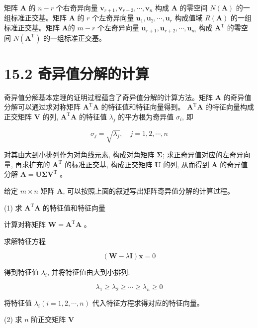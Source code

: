 \documentclass[10pt]{article}
\begin{document}
矩阵 $\boldsymbol{A}$ 的 $n-r$ 个右奇异向量 $\boldsymbol{v}_{r+1}, \boldsymbol{v}_{r+2}, \cdots, \boldsymbol{v}_{n}$ 构成 $\boldsymbol{A}$ 的零空间 $N(\boldsymbol{A})$ 的一组标准正交基。矩阵 $\boldsymbol{A}$ 的 $r$ 个左奇异向量 $\boldsymbol{u}_{1}, \boldsymbol{u}_{2}, \cdots, \boldsymbol{u}_{r}$ 构成值域 $R(\boldsymbol{A})$ 的一组标准正交基。矩阵 $\boldsymbol{A}$的 $m-r$ 个左奇异向量 $\boldsymbol{u}_{r+1}, \boldsymbol{u}_{r+2}, \cdots, \boldsymbol{u}_{m}$ 构成 $\boldsymbol{A}^{\mathrm{T}}$ 的零空间 $N\left(\boldsymbol{A}^{\mathrm{T}}\right)$ 的一组标准正交基。

\section*{15.2 奇异值分解的计算}
奇异值分解基本定理的证明过程蕴含了奇异值分解的计算方法。矩阵 $\boldsymbol{A}$ 的奇异值分解可以通过求对称矩阵 $\boldsymbol{A}^{\mathrm{T}} \boldsymbol{A}$ 的特征值和特征向量得到。 $\boldsymbol{A}^{\mathrm{T}} \boldsymbol{A}$ 的特征向量构成正交矩阵 $\boldsymbol{V}$ 的列, $\boldsymbol{A}^{\mathrm{T}} \boldsymbol{A}$ 的特征值 $\lambda_{j}$ 的平方根为奇异值 $\sigma_{i}$, 即

$$
\sigma_{j}=\sqrt{\lambda_{j}}, \quad j=1,2, \cdots, n
$$

对其由大到小排列作为对角线元素, 构成对角矩阵 $\boldsymbol{\Sigma}$; 求正奇异值对应的左奇异向量, 再求扩充的 $\boldsymbol{A}^{\mathrm{T}}$ 的标准正交基, 构成正交矩阵 $\boldsymbol{U}$ 的列, 从而得到 $\boldsymbol{A}$ 的奇异值分解 $\boldsymbol{A}=\boldsymbol{U} \boldsymbol{\Sigma} \boldsymbol{V}^{\mathrm{T}}$ 。

给定 $m \times n$ 矩阵 $\boldsymbol{A}$, 可以按照上面的叙述写出矩阵奇异值分解的计算过程。

(1) 求 $\boldsymbol{A}^{\mathrm{T}} \boldsymbol{A}$ 的特征值和特征向量

计算对称矩阵 $\boldsymbol{W}=\boldsymbol{A}^{\mathrm{T}} \boldsymbol{A}$ 。

求解特征方程

$$
(\boldsymbol{W}-\lambda \boldsymbol{I}) \boldsymbol{x}=0
$$

得到特征值 $\lambda_{i}$, 并将特征值由大到小排列:

$$
\lambda_{1} \geqslant \lambda_{2} \geqslant \cdots \geqslant \lambda_{n} \geqslant 0
$$

将特征值 $\lambda_{i}(i=1,2, \cdots, n)$ 代入特征方程求得对应的特征向量。

(2) 求 $n$ 阶正交矩阵 $\boldsymbol{V}$
\end{document}
